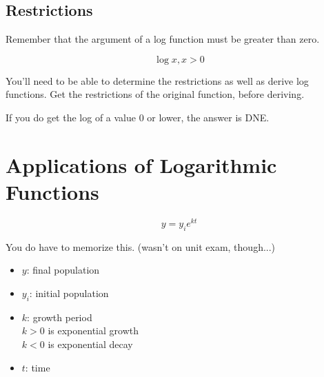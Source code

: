 \documentclass[a4paper,12pt]{article}
\begin{document}
\subsection{Restrictions}
Remember that the argument of a log function must be greater than zero.

$$\log{x}, x > 0$$

You'll need to be able to determine the restrictions as well as derive log functions. Get the restrictions of the original function, before deriving.

If you do get the log of a value 0 or lower, the answer is DNE.

\section{Applications of Logarithmic Functions}
\Large
$$y = y_ie^{kt}$$
\normalsize

You do have to memorize this. (wasn't on unit exam, though...)
\begin{itemize}
    \item{$y$: final population}
    \item{$y_i$: initial population}
    \item{$k$: growth period \\ $k > 0$ is exponential growth \\ $k < 0$ is exponential decay}
    \item{$t$: time}
\end{itemize}
\end{document}
